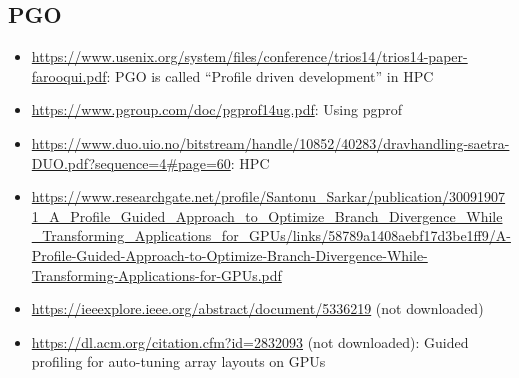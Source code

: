 \subsection{PGO}
\begin{sloppypar}
\begin{itemize}
	\item \url{https://www.usenix.org/system/files/conference/trios14/trios14-paper-farooqui.pdf}: PGO is called \enquote{Profile driven development} in HPC
	\item \url{https://www.pgroup.com/doc/pgprof14ug.pdf}: Using pgprof
	\item \url{https://www.duo.uio.no/bitstream/handle/10852/40283/dravhandling-saetra-DUO.pdf?sequence=4#page=60}: HPC
	\item \url{https://www.researchgate.net/profile/Santonu_Sarkar/publication/300919071_A_Profile_Guided_Approach_to_Optimize_Branch_Divergence_While_Transforming_Applications_for_GPUs/links/58789a1408aebf17d3be1ff9/A-Profile-Guided-Approach-to-Optimize-Branch-Divergence-While-Transforming-Applications-for-GPUs.pdf}
	\item \url{https://ieeexplore.ieee.org/abstract/document/5336219} (not downloaded)
	\item \url{https://dl.acm.org/citation.cfm?id=2832093} (not downloaded): Guided profiling for auto-tuning array layouts on GPUs
\end{itemize}
\end{sloppypar}